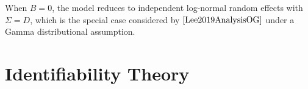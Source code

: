 \documentclass[]{article}
\theoremstyle{definition}
\begin{document}
When $B=0$, the model reduces to independent log-normal random effects with $\Sigma=D$, which is the special case considered by $\cite{Lee2019AnalysisOG}$ under a Gamma distributional assumption. 


\newpage
\section{Identifiability Theory}

\newpage

	
\end{document}
